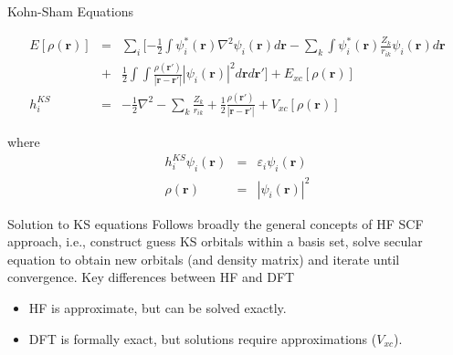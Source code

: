 \documentclass[aspectratio=169]{beamer}
\let \vec \mathbf
\begin{document}
\begin{frame}{Kohn-Sham Equations}

\begin{eqnarray*}
    E[\rho(\vec{r})] & = & \sum_i [ -\frac{1}{2} \int \psi_i^*(\vec{r}) \nabla^2 \psi_i(\vec{r}) d\vec{r} 
    - \sum_k \int \psi_i^*(\vec{r})\frac{Z_k}{r_{ik}} \psi_i(\vec{r}) d\vec{r}  \\
    & + &  \frac{1}{2} \int \int \frac{\rho(\vec{r'})}{|\vec{r}-\vec{r'}|}|\psi_i(\vec{r})|^2 d\vec{r}d\vec{r'} ]+ E_{xc}[\rho(\vec{r})]\\
    h_i^{KS} & = & -\frac{1}{2} \nabla^2  
    - \sum_k \frac{Z_k}{r_{ik}} + \frac{1}{2} \frac{\rho(\vec{r'})}{|\vec{r}-\vec{r'}|}+ V_{xc}[\rho(\vec{r})]
\end{eqnarray*}

where 
\begin{eqnarray*}
h_i^{KS} \psi_i(\vec{r}) & = & \varepsilon_i \psi_i(\vec{r}) \\
\rho(\vec{r}) &=& |\psi_i(\vec{r})|^2
\end{eqnarray*}
\end{frame} 

\begin{frame}{Solution to KS equations}
Follows broadly the general concepts of HF SCF approach, i.e., construct guess KS orbitals within a basis set, solve secular equation to obtain new orbitals (and density matrix) and iterate until convergence.\newline
\newline
Key differences between HF and DFT
\begin{itemize}
    \item HF is approximate, but can be solved exactly.
    \item DFT is formally exact, but solutions require approximations ($V_{xc}$).
\end{itemize}

\end{frame} 
\end{document}

